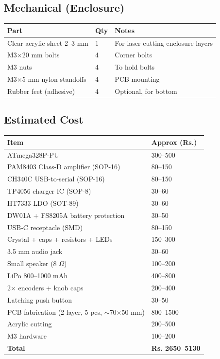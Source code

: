 \documentclass[a4paper,11pt]{article}
\renewcommand*{\,}{ }%
\begin{document}
\subsection{Mechanical (Enclosure)}

\begin{longtable}{@{}p{5cm}p{1cm}p{6.5cm}@{}}
\toprule
\textbf{Part} & \textbf{Qty} & \textbf{Notes} \\
\midrule
\endhead
Clear acrylic sheet 2--3\,mm & 1 & For laser cutting enclosure layers \\
M3$\times$20\,mm bolts & 4 & Corner bolts \\
M3 nuts & 4 & To hold bolts \\
M3$\times$5\,mm nylon standoffs & 4 & PCB mounting \\
Rubber feet (adhesive) & 4 & Optional, for bottom \\
\bottomrule
\end{longtable}

\subsection{Estimated Cost}

\begin{longtable}{@{}p{6cm}p{3cm}@{}}
\toprule
\textbf{Item} & \textbf{Approx (Rs.)} \\
\midrule
\endhead
ATmega328P-PU & 300--500 \\
PAM8403 Class-D amplifier (SOP-16) & 80--150 \\
CH340C USB-to-serial (SOP-16) & 80--150 \\
TP4056 charger IC (SOP-8) & 30--60 \\
HT7333 LDO (SOT-89) & 30--60 \\
DW01A + FS8205A battery protection & 30--50 \\
USB-C receptacle (SMD) & 80--150 \\
Crystal + caps + resistors + LEDs & 150--300 \\
3.5\,mm audio jack & 30--60 \\
Small speaker (8\,$\Omega$) & 100--200 \\
LiPo 800--1000\,mAh & 400--800 \\
2$\times$ encoders + knob caps & 200--400 \\
Latching push button & 30--50 \\
PCB fabrication (2-layer, 5 pcs, $\sim$70$\times$50\,mm) & 800--1500 \\
Acrylic cutting & 200--500 \\
M3 hardware & 100--200 \\
\midrule
\textbf{Total} & \textbf{Rs.\,2650--5130} \\
\bottomrule
\end{longtable}
\end{document}

